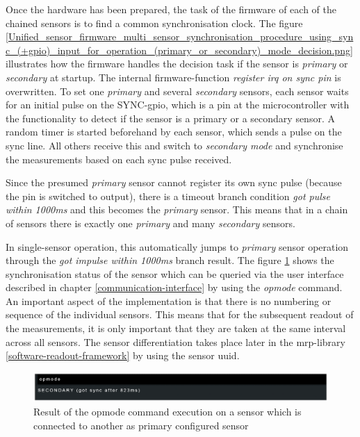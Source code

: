 Once the hardware has been prepared, the task of the firmware of each of
the chained sensors is to find a common synchronisation clock. The
figure
\ref{Unified_sensor_firmware_multi_sensor_synchronisation_procedure_using_sync_(+gpio)_input_for_operation_(primary_or_secondary)_mode_decision.png}
illustrates how the firmware handles the decision task if the sensor is
\emph{primary} or \emph{secondary} at startup. The internal
firmware-function \emph{register irq on sync pin} is overwritten. To set
one \emph{primary} and several \emph{secondary} sensors, each sensor
waits for an initial pulse on the SYNC-\gls{gpio}, which is a pin at the
microcontroller with the functionality to detect if the sensor is a
primary or a secondary sensor. A random timer is started beforehand by
each sensor, which sends a pulse on the sync line. All others receive
this and switch to \emph{secondary mode} and synchronise the
measurements based on each sync pulse received.

Since the presumed \emph{primary} sensor cannot register its own sync
pulse (because the pin is switched to output), there is a timeout branch
condition \emph{got pulse within 1000ms} and this becomes the
\emph{primary} sensor. This means that in a chain of sensors there is
exactly one \emph{primary} and many \emph{secondary} sensors.

In single-sensor operation, this automatically jumps to \emph{primary}
sensor operation through the \emph{got impulse within 1000ms} branch
result. The figure
\ref{Result_of_the_opmode_command_execution_on_a_sensor_which_is_connected_to_another_as_primary_configured_sensor.png}
shows the synchronisation status of the sensor which can be queried via
the user interface described in chapter \ref{communication-interface} by
using the \emph{opmode} command. An important aspect of the
implementation is that there is no numbering or sequence of the
individual sensors. This means that for the subsequent readout of the
measurements, it is only important that they are taken at the same
interval across all sensors. The sensor differentiation takes place
later in the \gls{mrp}-library \ref{software-readout-framework} by using
the sensor \gls{uuid}.

\begin{figure}
\centering
\includegraphics{./generated_images/border_Result_of_the_opmode_command_execution_on_a_sensor_which_is_connected_to_another_as_primary_configured_sensor.png}
\caption{Result of the opmode command execution on a sensor which is
connected to another as primary configured sensor
\label{Result_of_the_opmode_command_execution_on_a_sensor_which_is_connected_to_another_as_primary_configured_sensor.png}}
\end{figure}

